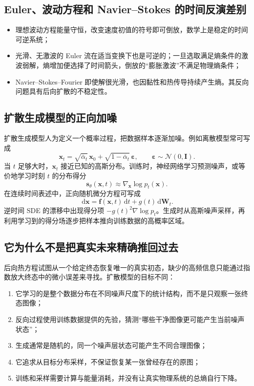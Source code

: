 \documentclass[cn,hazy,blue,11pt,normal]{elegantnote}
\numberwithin{equation}{section}
\newcommand{\dd}{\,\mathrm d}
\newcommand{\vct}[1]{\bm{#1}}
\newcommand{\ten}[1]{\bm{#1}}
\begin{document}
\subsection{Euler、波动方程和 Navier--Stokes 的时间反演差别}

\begin{itemize}
 \item 理想波动方程能量守恒，改变速度初值的符号即可倒放，数学上是稳定的时间可逆系统；
 \item 光滑、无激波的 Euler 流在适当变换下也是可逆的；一旦选取满足熵条件的激波弱解，熵增加便选择了时间箭头，倒放的“膨胀激波”不满足物理熵条件；
 \item Navier--Stokes--Fourier 即使解很光滑，也因黏性和热传导持续产生熵。其反向问题具有后向扩散的不稳定性。
\end{itemize}

\subsection{扩散生成模型的正向加噪}

扩散生成模型人为定义一个概率过程，把数据样本逐渐加噪。例如离散模型常可写成
\begin{equation}
 \boxed{\vct x_t=\sqrt{\bar\alpha_t}\,\vct x_0
 +\sqrt{1-\bar\alpha_t}\,\vct\varepsilon,}
 \qquad \vct\varepsilon\sim\mathcal N(0,\ten I).
\end{equation}
当 $t$ 足够大时，$\vct x_t$ 接近已知的高斯分布。训练时，神经网络学习预测噪声，或等价地学习时刻 $t$ 的分布得分
\begin{equation}
 \vct s_\theta(\vct x,t)
 \approx\nabla_{\vct x}\log p_t(\vct x).
\end{equation}
在连续时间表述中，正向随机微分方程可写成
\begin{equation}
 \dd\vct x=\vct f(\vct x,t)\dd t+g(t)\dd\vct W_t.
\end{equation}
逆时间 SDE 的漂移中出现得分项 $-g(t)^2\nabla\log p_t$。生成时从高斯噪声采样，再利用学习到的得分场逐步把样本推向训练数据的高概率区域。

\subsection{它为什么不是把真实未来精确推回过去}

后向热方程试图从一个给定终态恢复唯一的真实初态，缺少的高频信息只能通过指数放大终态中的微小误差来寻找。扩散模型的目标不同：
\begin{enumerate}
 \item 它学习的是整个数据分布在不同噪声尺度下的统计结构，而不是只观察一张终态图像；
 \item 反向过程使用训练数据提供的先验，猜测“哪些干净图像更可能产生当前噪声状态”；
 \item 生成通常是随机的，同一个噪声层状态可能产生不同合理图像；
 \item 它追求从目标分布采样，不保证恢复某一张曾经存在的原图；
 \item 训练和采样需要计算与能量消耗，并没有让真实物理系统的总熵自行下降。
\end{enumerate}
\end{document}
